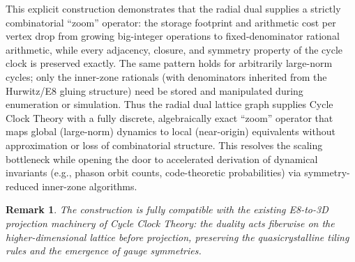 \documentclass{article}
\newtheorem{remark}{Remark}
\begin{document}
This explicit construction demonstrates that the radial dual supplies a strictly combinatorial “zoom” operator: the storage footprint and arithmetic cost per vertex drop from growing big-integer operations to fixed-denominator rational arithmetic, while every adjacency, closure, and symmetry property of the cycle clock is preserved exactly. The same pattern holds for arbitrarily large-norm cycles; only the inner-zone rationals (with denominators inherited from the Hurwitz/E8 gluing structure) need be stored and manipulated during enumeration or simulation.
Thus the radial dual lattice graph supplies Cycle Clock Theory with a fully discrete, algebraically exact ``zoom'' operator that maps global (large-norm) dynamics to local (near-origin) equivalents without approximation or loss of combinatorial structure. This resolves the scaling bottleneck while opening the door to accelerated derivation of dynamical invariants (e.g., phason orbit counts, code-theoretic probabilities) via symmetry-reduced inner-zone algorithms.
\begin{remark}
The construction is fully compatible with the existing E8-to-3D projection machinery of Cycle Clock Theory: the duality acts fiberwise on the higher-dimensional lattice before projection, preserving the quasicrystalline tiling rules \cite{FangIrwin2015,FangIrwinKovacsSadler2019} and the emergence of gauge symmetries.
\end{remark}
\end{document}
